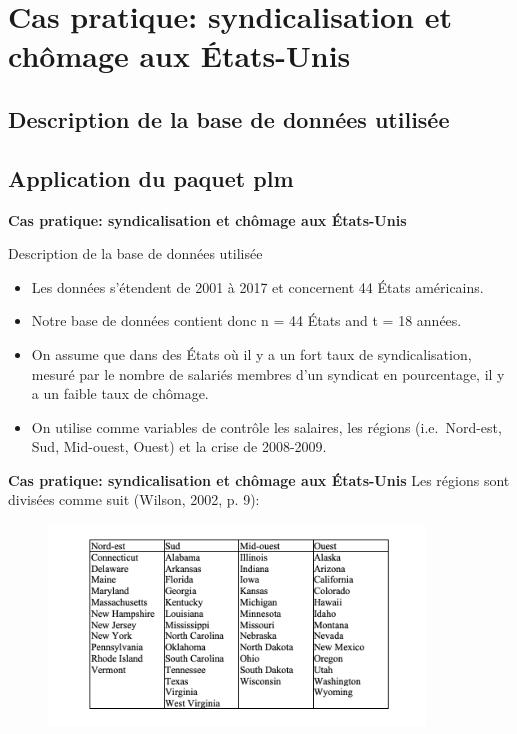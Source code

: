 \documentclass{beamer}
\begin{document}
\section{\textbf{Cas pratique: syndicalisation et ch\^omage aux \'Etats-Unis}}
\subsection{Description de la base de donn\'ees utilis\'ee}
\subsection{Application du paquet plm}
\begin{frame}{\textbf{Cas pratique: syndicalisation et ch\^omage aux \'Etats-Unis}}
\begin{block}{Description de la base de donn\'ees utilis\'ee}
\end{block}
\begin{itemize}
\item Les donn\'ees s'\'etendent de 2001 \`a 2017 et concernent 44 \'Etats am\'ericains. 
\item Notre base de donn\'ees contient donc n = 44 \'Etats and t = 18 ann\'ees. 
\item On assume que dans des \'Etats o\`u il y a un fort taux de syndicalisation, mesur\'e par le nombre de salari\'es membres d'un syndicat en pourcentage, il y a un faible taux de ch\^omage. 
\item On utilise comme variables de contr\^ole les salaires, les r\'egions (i.e.\ Nord-est, Sud, Mid-ouest, Ouest) et la crise de 2008-2009. 
\end{itemize}
\end{frame}
\begin{frame}{\textbf{Cas pratique: syndicalisation et ch\^omage aux \'Etats-Unis}}
Les r\'egions sont divis\'ees comme suit (Wilson, 2002, p. 9): 
\begin{figure}
\begin{center}
\includegraphics [width=10cm] {RUSA.png} 
\end{center}
\end{figure}
\end{frame}
\end{document}
